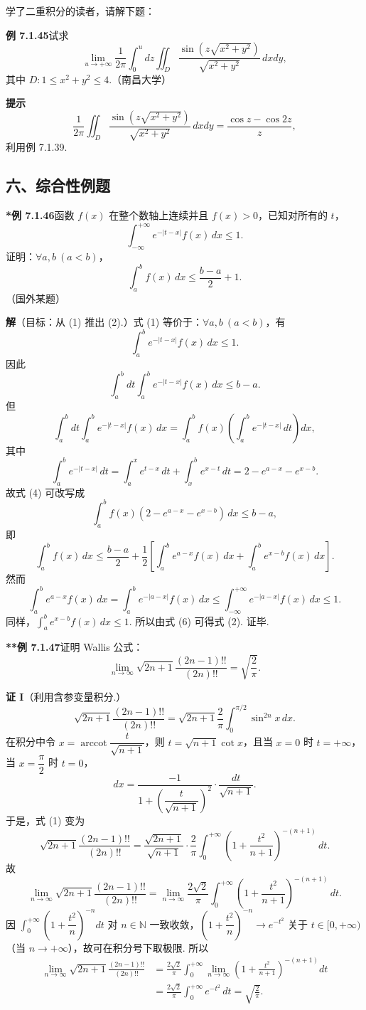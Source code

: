 \documentclass[UTF8,12pt,a4paper,fontset=fandol]{ctexart}
\begin{document}
学了二重积分的读者，请解下题：

\noindent\textbf{例 7.1.45}\quad 试求
\[
\lim_{u\to+\infty}\frac1{2\pi}\int_0^u dz\iint_D
\frac{\sin\left(z\sqrt{x^2+y^2}\right)}{\sqrt{x^2+y^2}}\,dxdy,
\]
其中 $D:1\le x^2+y^2\le4$.（南昌大学）

\noindent\textbf{提示}\quad
\[
\frac1{2\pi}\iint_D\frac{\sin\left(z\sqrt{x^2+y^2}\right)}{\sqrt{x^2+y^2}}\,dxdy
=\frac{\cos z-\cos2z}{z},
\]
利用例 7.1.39.

\subsection*{六、综合性例题}

\noindent\textbf{*例 7.1.46}\quad 函数 $f(x)$ 在整个数轴上连续并且 $f(x)>0$，已知对所有的 $t$，
\[
\int_{-\infty}^{+\infty}e^{-|t-x|}f(x)\,dx\le1.
\tag{1}
\]
证明：$\forall a,b\ (a<b)$，
\[
\int_a^bf(x)\,dx\le\frac{b-a}{2}+1.
\tag{2}
\]
（国外某题）

\noindent\textbf{解}\quad （目标：从 (1) 推出 (2).）式 (1) 等价于：$\forall a,b\ (a<b)$，有
\[
\int_a^be^{-|t-x|}f(x)\,dx\le1.
\tag{3}
\]
因此
\[
\int_a^b dt\int_a^be^{-|t-x|}f(x)\,dx\le b-a.
\tag{4}
\]
但
\[
\int_a^b dt\int_a^be^{-|t-x|}f(x)\,dx
=\int_a^bf(x)\left(\int_a^be^{-|t-x|}\,dt\right)dx,
\]
其中
\[
\int_a^be^{-|t-x|}\,dt
=\int_a^xe^{t-x}\,dt+\int_x^be^{x-t}\,dt=2-e^{a-x}-e^{x-b}.
\]
故式 (4) 可改写成
\[
\int_a^bf(x)(2-e^{a-x}-e^{x-b})\,dx\le b-a,
\tag{5}
\]
即
\[
\int_a^bf(x)\,dx\le\frac{b-a}{2}
+\frac12\left[\int_a^be^{a-x}f(x)\,dx+\int_a^be^{x-b}f(x)\,dx\right].
\tag{6}
\]
然而
\[
\int_a^be^{a-x}f(x)\,dx
=\int_a^be^{-|a-x|}f(x)\,dx
\le\int_{-\infty}^{+\infty}e^{-|a-x|}f(x)\,dx\le1.
\]
同样，$\displaystyle\int_a^be^{x-b}f(x)\,dx\le1$. 所以由式 (6) 可得式 (2). 证毕.

\noindent\textbf{**例 7.1.47}\quad 证明 Wallis 公式：
\[
\lim_{n\to\infty}\sqrt{2n+1}\frac{(2n-1)!!}{(2n)!!}=\sqrt{\frac2\pi}.
\]

\noindent\textbf{证 I}\quad （利用含参变量积分.）
\[
\sqrt{2n+1}\frac{(2n-1)!!}{(2n)!!}
=\sqrt{2n+1}\frac2\pi\int_0^{\pi/2}\sin^{2n}x\,dx.
\tag{1}
\]
在积分中令 $x=\operatorname{arccot}\dfrac{t}{\sqrt{n+1}}$，则 $t=\sqrt{n+1}\cot x$，且当 $x=0$ 时 $t=+\infty$，当 $x=\dfrac\pi2$ 时 $t=0$，
\[
dx=\frac{-1}{1+\left(\dfrac{t}{\sqrt{n+1}}\right)^2}\cdot\frac{dt}{\sqrt{n+1}}.
\]
于是，式 (1) 变为
\[
\sqrt{2n+1}\frac{(2n-1)!!}{(2n)!!}
=\frac{\sqrt{2n+1}}{\sqrt{n+1}}\cdot\frac2\pi
\int_0^{+\infty}\left(1+\frac{t^2}{n+1}\right)^{-(n+1)}\,dt.
\]
故
\[
\lim_{n\to\infty}\sqrt{2n+1}\frac{(2n-1)!!}{(2n)!!}
=\lim_{n\to\infty}\frac{2\sqrt2}{\pi}
\int_0^{+\infty}\left(1+\frac{t^2}{n+1}\right)^{-(n+1)}\,dt.
\]
因 $\displaystyle\int_0^{+\infty}\left(1+\dfrac{t^2}{n}\right)^{-n}dt$ 对 $n\in\mathbb N$ 一致收敛，$\left(1+\dfrac{t^2}{n}\right)^{-n}\to e^{-t^2}$ 关于 $t\in[0,+\infty)$（当 $n\to+\infty$），故可在积分号下取极限. 所以
\[
\begin{aligned}
\lim_{n\to\infty}\sqrt{2n+1}\frac{(2n-1)!!}{(2n)!!}
&=\frac{2\sqrt2}{\pi}\int_0^{+\infty}\lim_{n\to\infty}
\left(1+\frac{t^2}{n+1}\right)^{-(n+1)}dt\\
&=\frac{2\sqrt2}{\pi}\int_0^{+\infty}e^{-t^2}\,dt=\sqrt{\frac2\pi}.
\end{aligned}
\]
\end{document}
